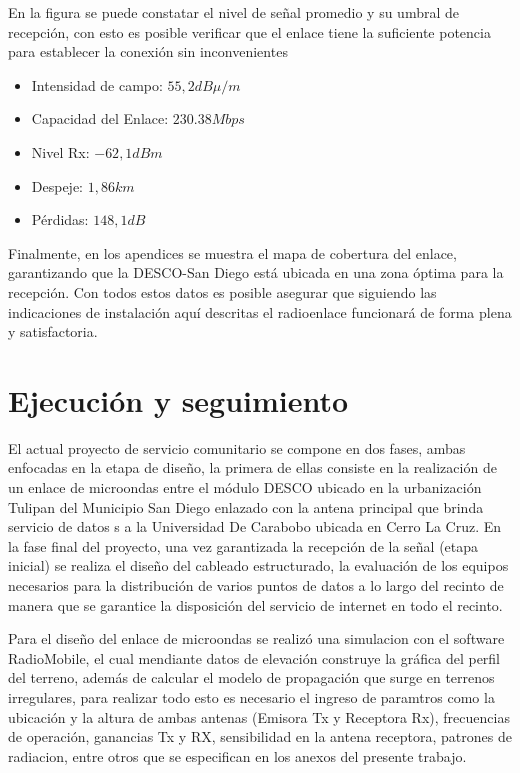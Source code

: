 \documentclass[11pt, a4paper, twosides]{report}
\begin{document}
En la figura se puede constatar el nivel de señal promedio y su umbral de recepción, con esto es posible verificar que el enlace tiene la suficiente potencia para establecer la conexión sin inconvenientes 

\begin{itemize}
\item Intensidad de campo: $55, 2dB\mu/m$
\item Capacidad del Enlace: $230.38 Mbps$
\item Nivel Rx: $-62,1dBm$
\item Despeje: $1, 86km$
\item Pérdidas: $148,1dB$
\end{itemize}

Finalmente, en los apendices se muestra el mapa de cobertura del enlace, garantizando que la DESCO-San Diego está ubicada en una zona óptima para la recepción. Con todos estos datos es posible asegurar que siguiendo las indicaciones de instalación aquí descritas el radioenlace funcionará de forma plena y satisfactoria.


\chapter{Ejecución y seguimiento}
El  actual proyecto de servicio comunitario se compone en dos fases, ambas enfocadas en la etapa de diseño, la primera de ellas consiste en la realización de un enlace de microondas entre el módulo DESCO ubicado en la urbanización Tulipan del Municipio San Diego enlazado con  la antena principal que brinda servicio de datos s a la Universidad De Carabobo ubicada en Cerro La Cruz. En la fase final del proyecto, una vez garantizada la recepción de la señal (etapa inicial) se realiza el diseño del cableado estructurado, la evaluación de los equipos necesarios para la distribución de varios puntos de datos a lo largo del recinto de manera que se garantice la  disposición del servicio de internet en todo el recinto. 

Para el diseño del enlace de microondas se realizó una  simulacion con el software RadioMobile, el cual mendiante datos de elevación construye la gráfica del perfil del terreno, además de calcular el modelo de propagación que surge en terrenos irregulares, para realizar todo esto es necesario el ingreso de paramtros como la ubicación y la altura de ambas antenas (Emisora Tx y Receptora Rx), frecuencias de operación, ganancias Tx y RX, sensibilidad en la antena receptora, patrones de radiacion, entre otros que se especifican en los anexos del presente trabajo.
\end{document}
